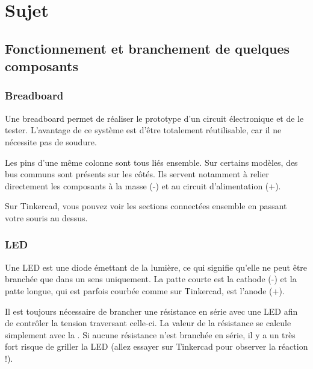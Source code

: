 \section{Sujet}

\subsection{Fonctionnement et branchement de quelques composants}

\subsubsection{Breadboard}

Une breadboard permet de réaliser le prototype d'un circuit électronique et de le tester. L'avantage de ce système est d'être totalement réutilisable, car il ne nécessite pas de soudure.

Les pins d'une même colonne sont tous liés ensemble.
Sur certains modèles, des bus communs sont présents sur les côtés.
Ils servent notamment à relier directement les composants à la masse (-) et au circuit d'alimentation (+).

Sur Tinkercad, vous pouvez voir les sections connectées ensemble en passant votre souris au dessus.


\subsubsection{LED}

Une LED est une diode émettant de la lumière, ce qui signifie qu'elle ne peut être branchée que dans un sens uniquement.
La patte courte est la cathode (-) et la patte longue, qui est parfois courbée comme sur Tinkercad, est l'anode (+).

Il est toujours nécessaire de brancher une résistance en série avec une LED afin de contrôler la tension traversant celle-ci.
La valeur de la résistance se calcule simplement avec la .
Si aucune résistance n'est branchée en série, il y a un très fort risque de griller la LED (allez essayer sur Tinkercad pour observer la réaction !).



